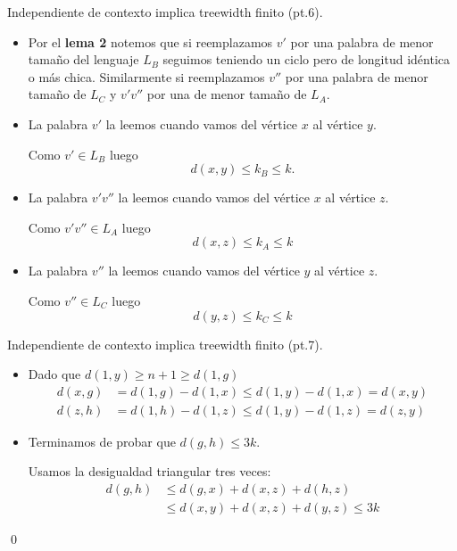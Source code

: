 \documentclass[aspectratio=169, 11pt]{beamer}
\begin{document}
	\begin{frame}[fragile]{Independiente de contexto implica treewidth finito (pt.6).}
		\begin{itemize}
			\item 
				Por el \textbf{lema 2} notemos que si reemplazamos $v'$ por una palabra de menor tamaño del lenguaje $L_B$ seguimos teniendo un ciclo pero de longitud idéntica o más chica.
				Similarmente si reemplazamos $v''$ por una palabra de menor tamaño de $L_{C}$ y $v'v''$ por una de menor tamaño de $L_{A}$. 
				
			\item
				La palabra $v'$ la leemos cuando vamos del vértice $x$ al vértice $y$.

				Como $v' \in L_{B}$ luego 
				\[
					d(x,y) \le k_{B} \le k.	
				\]

			\item 
				La palabra $v'v''$ la leemos cuando vamos del vértice $x$ al vértice $z$.

				Como $v'v'' \in L_{A}$ luego 
				\[
					d(x,z) \le k_{A} \le k	
				\]

			\item 
				La palabra $v''$ la leemos cuando vamos del vértice $y$ al vértice $z$.

				Como $v'' \in L_{C}$ luego 
				\[
					d(y,z) \le k_{C} \le k	
				\] 

		\end{itemize}
	\end{frame}
	\begin{frame}[fragile]{Independiente de contexto implica treewidth finito (pt.7).}
		\begin{itemize}
			\item 
				Dado que $d(1,y) \ge n+1 \ge d(1,g)$ 
				\begin{align*}
					d(x,g) &= d(1,g) - d(1,x)  \le d(1,y) - d(1,x) = d(x,y) \\
					d(z,h) &= d(1,h) - d(1,z)  \le d(1,y) - d(1,z) = d(z,y)
				\end{align*}
			\item 
				Terminamos de probar que $d(g,h) \le 3k$. 
				
				Usamos la desigualdad triangular tres veces:
				\begin{align*}
					d(g,h) & \le d(g,x) + d(x,z) + d(h,z) \\
					& \le d(x,y) + d(x,z) + d(y,z) \le 3k
				\end{align*}
		\end{itemize}
		\qed
	\end{frame}
\end{document}
